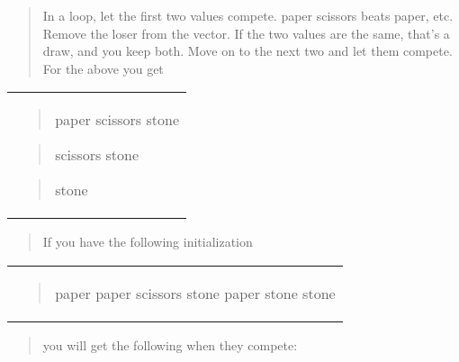 \documentclass[
]{article}
\begin{document}
\begin{quote}
In a loop, let the first two values compete. paper scissors beats paper,
etc. Remove the loser from the vector. If the two values are the same,
that's a draw, and you keep both. Move on to the next two and let them
compete. For the above you get
\end{quote}

\begin{longtable}[]{@{}
  >{\raggedright\arraybackslash}p{}@{}}
\toprule\noalign{}
 \\
\midrule\noalign{}
\endhead
\bottomrule\noalign{}
\endlastfoot
\begin{quote}
paper scissors stone
\end{quote}

\begin{quote}
scissors stone
\end{quote}

\begin{quote}
stone
\end{quote} \\
\end{longtable}

\begin{quote}
If you have the following initialization
\end{quote}

\begin{longtable}[]{@{}
  >{\raggedright\arraybackslash}p{}@{}}
\toprule\noalign{}
 \\
\midrule\noalign{}
\endhead
\bottomrule\noalign{}
\endlastfoot
\begin{quote}
paper paper scissors stone paper stone stone
\end{quote} \\
\end{longtable}

\begin{quote}
you will get the following when they compete:
\end{quote}
\end{document}
